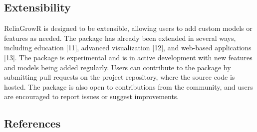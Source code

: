 \documentclass[
]{article}
\begin{document}
\subsection{Extensibility}\label{extensibility}

ReliaGrowR is designed to be extensible, allowing users to add custom
models or features as needed. The package has already been extended in
several ways, including education {[}11{]}, advanced visualization
{[}12{]}, and web-based applications {[}13{]}. The package is
experimental and is in active development with new features and models
being added regularly. Users can contribute to the package by submitting
pull requests on the project repository, where the source code is
hosted. The package is also open to contributions from the community,
and users are encouraged to report issues or suggest improvements.

\subsection{References}\label{references}
\end{document}
